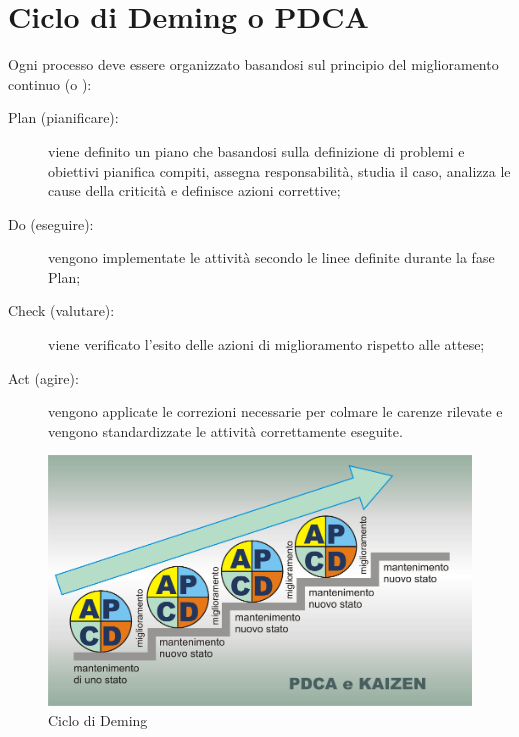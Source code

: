 \documentclass[PianoDiQualifica.tex]{subfiles}
\begin{document}
		
\chapter{Ciclo di Deming o PDCA}
Ogni processo deve essere organizzato basandosi sul principio del miglioramento continuo (o ):
\begin{description}
	\item [Plan (pianificare):] viene definito un piano che basandosi sulla definizione di problemi e obiettivi pianifica compiti, assegna responsabilità, studia il caso, analizza le cause della criticità e definisce azioni correttive; 
	\item [Do (eseguire):] vengono implementate le attività secondo le linee definite durante la fase Plan;
	\item [Check (valutare):] viene verificato l'esito delle azioni di miglioramento rispetto alle attese;
	\item [Act (agire):] vengono applicate le correzioni necessarie per colmare le carenze rilevate e vengono standardizzate le attività correttamente eseguite.
\end{description}

\begin{figure}[htbp]
	\begin{center}
		\includegraphics[width=0.7\linewidth]{PDCAkaizen}
		\caption[Ciclo di Deming]{Ciclo di Deming}
		\label{fig:pdca}
	\end{center}
\end{figure}
\end{document}
